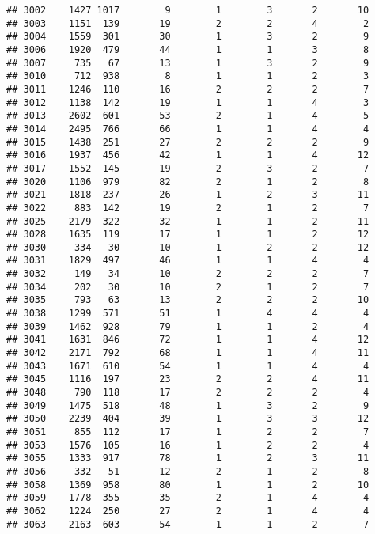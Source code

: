 \documentclass[]{article}
\begin{document}
\begin{verbatim}
## 3002    1427 1017        9        1        3       2       10
## 3003    1151  139       19        2        2       4        2
## 3004    1559  301       30        1        3       2        9
## 3006    1920  479       44        1        1       3        8
## 3007     735   67       13        1        3       2        9
## 3010     712  938        8        1        1       2        3
## 3011    1246  110       16        2        2       2        7
## 3012    1138  142       19        1        1       4        3
## 3013    2602  601       53        2        1       4        5
## 3014    2495  766       66        1        1       4        4
## 3015    1438  251       27        2        2       2        9
## 3016    1937  456       42        1        1       4       12
## 3017    1552  145       19        2        3       2        7
## 3020    1106  979       82        2        1       2        8
## 3021    1818  237       26        1        2       3       11
## 3022     883  142       19        2        1       2        7
## 3025    2179  322       32        1        1       2       11
## 3028    1635  119       17        1        1       2       12
## 3030     334   30       10        1        2       2       12
## 3031    1829  497       46        1        1       4        4
## 3032     149   34       10        2        2       2        7
## 3034     202   30       10        2        1       2        7
## 3035     793   63       13        2        2       2       10
## 3038    1299  571       51        1        4       4        4
## 3039    1462  928       79        1        1       2        4
## 3041    1631  846       72        1        1       4       12
## 3042    2171  792       68        1        1       4       11
## 3043    1671  610       54        1        1       4        4
## 3045    1116  197       23        2        2       4       11
## 3048     790  118       17        2        2       2        4
## 3049    1475  518       48        1        3       2        9
## 3050    2239  404       39        1        3       3       12
## 3051     855  112       17        1        2       2        7
## 3053    1576  105       16        1        2       2        4
## 3055    1333  917       78        1        2       3       11
## 3056     332   51       12        2        1       2        8
## 3058    1369  958       80        1        1       2       10
## 3059    1778  355       35        2        1       4        4
## 3062    1224  250       27        2        1       4        4
## 3063    2163  603       54        1        1       2        7

\end{verbatim}
\end{document}
